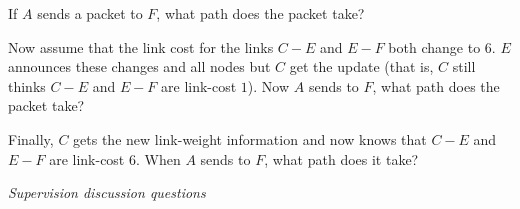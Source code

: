 \documentclass{supervision}
\begin{document}
\begin{questions}
\begin{parts}
\begin{subparts}
            \subpart If $A$ sends a packet to $F$, what path does the packet
              take?

            \subpart Now assume that the link cost for the links $C-E$ and
              $E-F$ both change to $6$. $E$ announces these changes and all
              nodes but $C$ get the update (that is, $C$ still thinks $C-E$
              and $E-F$ are link-cost $1$). Now $A$ sends to $F$, what path
              does the packet take?

            \subpart Finally, $C$ gets the new link-weight information and
              now knows that $C-E$ and $E-F$ are link-cost $6$. When $A$
              sends to $F$, what path does it take?

          \end{subparts}
      \end{parts}
    \question \textit{Supervision discussion questions}
\end{questions}
\end{document}
